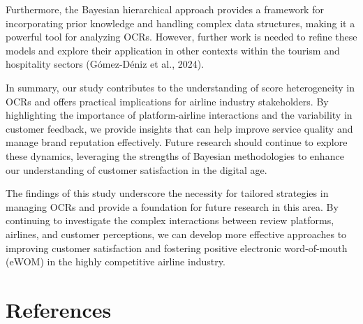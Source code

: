 \documentclass[
]{agujournal2019}
\begin{document}
Furthermore, the Bayesian hierarchical approach provides a framework for
incorporating prior knowledge and handling complex data structures,
making it a powerful tool for analyzing OCRs. However, further work is
needed to refine these models and explore their application in other
contexts within the tourism and hospitality sectors (Gómez-Déniz et al.,
2024).

In summary, our study contributes to the understanding of score
heterogeneity in OCRs and offers practical implications for airline
industry stakeholders. By highlighting the importance of
platform-airline interactions and the variability in customer feedback,
we provide insights that can help improve service quality and manage
brand reputation effectively. Future research should continue to explore
these dynamics, leveraging the strengths of Bayesian methodologies to
enhance our understanding of customer satisfaction in the digital age.

The findings of this study underscore the necessity for tailored
strategies in managing OCRs and provide a foundation for future research
in this area. By continuing to investigate the complex interactions
between review platforms, airlines, and customer perceptions, we can
develop more effective approaches to improving customer satisfaction and
fostering positive electronic word-of-mouth (eWOM) in the highly
competitive airline industry.

\section*{References}\label{references}
\end{document}
